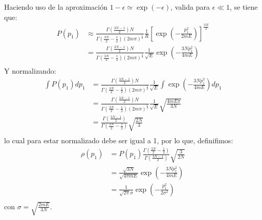 \begin{answer}
    Haciendo uso de la aproximación $1-\epsilon \simeq \exp (-\epsilon)$, valida para $\epsilon \ll 1$, se tiene que:
    \begin{align*}
        P(p_1) &\approx \frac{\Gamma \left( \frac{3N-1}{2} \right) N}{\Gamma \left( \frac{3N}{2} - \frac 12\right) (2m\pi)^{\frac 12}}\frac{1}{R} \left[\exp \left( -\frac{p_1^2}{2mE} \right)\right]^{\frac{3N}{2}}\\
        &= \frac{\Gamma \left( \frac{3N-1}{2} \right) N}{\Gamma \left( \frac{3N}{2} - \frac 12\right) (2m\pi)^{\frac 12}}\frac{1}{\sqrt{E}} \exp \left( -\frac{3Np_1^2}{4mE} \right)\\
    \end{align*}
    Y normalizando:
    \begin{align*}
        \int P(p_1) dp_1 &= \frac{\Gamma \left( \frac{3N-1}{2} \right) N}{\Gamma \left( \frac{3N}{2} - \frac 12\right) (2m\pi)^{\frac 12}}\frac{1}{\sqrt{E}} \int \exp \left( -\frac{3Np_1^2}{4mE} \right) dp_1\\
        &= \frac{\Gamma \left( \frac{3N-1}{2} \right) N}{\Gamma \left( \frac{3N}{2} - \frac 12\right) (2m\pi)^{\frac 12}}\frac{1}{\sqrt{E}} \sqrt{\frac{4mE\pi}{3N}}\\
        &= \frac{\Gamma \left( \frac{3N-1}{2} \right) }{\Gamma \left( \frac{3N}{2} - \frac 12\right) } \sqrt{\frac{2N}{3}}\\
    \end{align*}
    lo cual para estar normalizado debe ser igual a 1, por lo que, definifimos:
    \begin{align*}
        \rho(p_1) &= P(p_1) \frac{\Gamma \left( \frac{3N}{2} - \frac 12\right) }{\Gamma \left( \frac{3N-1}{2} \right) } \sqrt{\frac{3}{2N}}\\
        &= \frac{\sqrt{3N}}{\sqrt{4\pi m E}} \exp \left( -\frac{3Np_1^2}{4mE} \right)\\
        &= \frac{1}{\sqrt{2\pi} \sigma} \exp \left( -\frac{p_1^2}{2\sigma^2} \right)\\
    \end{align*}
    con $\sigma = \sqrt{\frac{2mE}{3N}}$.\\
\end{answer}